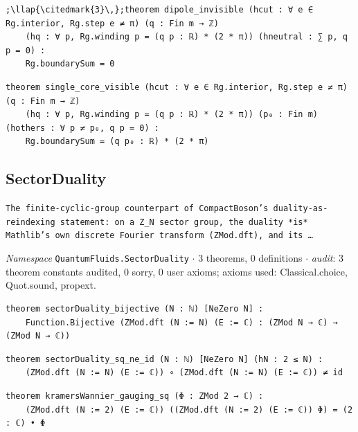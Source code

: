 \begin{lstlisting}[style=leancat]
;\llap{\citedmark{3}\,};theorem dipole_invisible (hcut : ∀ e ∈ Rg.interior, Rg.step e ≠ π) (q : Fin m → ℤ)
    (hq : ∀ p, Rg.winding p = (q p : ℝ) * (2 * π)) (hneutral : ∑ p, q p = 0) :
    Rg.boundarySum = 0
\end{lstlisting}

\begin{lstlisting}[style=leancat]
theorem single_core_visible (hcut : ∀ e ∈ Rg.interior, Rg.step e ≠ π) (q : Fin m → ℤ)
    (hq : ∀ p, Rg.winding p = (q p : ℝ) * (2 * π)) (p₀ : Fin m) (hothers : ∀ p ≠ p₀, q p = 0) :
    Rg.boundarySum = (q p₀ : ℝ) * (2 * π)
\end{lstlisting}

\subsection{SectorDuality}\label{appA:SectorDuality}
{\footnotesize\raggedright\texttt{The finite-\allowbreak{}cyclic-\allowbreak{}group counterpart of CompactBoson's duality-\allowbreak{}as-\allowbreak{}reindexing statement: on a Z\_\allowbreak{}N sector group,\allowbreak{} the duality *is* Mathlib's own discrete Fourier transform (ZMod.\allowbreak{}dft),\allowbreak{} and its …}\par}
{\footnotesize\raggedright\emph{Namespace} \texttt{QuantumFluids.\allowbreak{}SectorDuality} $\cdot$ 3 theorems, 0 definitions $\cdot$ \emph{audit}: 3 theorem constants audited, 0 sorry, 0 user axioms; axioms used: Classical.choice, Quot.sound, propext.\par}
\vspace{1pt}
\begin{lstlisting}[style=leancat]
theorem sectorDuality_bijective (N : ℕ) [NeZero N] :
    Function.Bijective (ZMod.dft (N := N) (E := ℂ) : (ZMod N → ℂ) → (ZMod N → ℂ))
\end{lstlisting}

\begin{lstlisting}[style=leancat]
theorem sectorDuality_sq_ne_id (N : ℕ) [NeZero N] (hN : 2 ≤ N) :
    (ZMod.dft (N := N) (E := ℂ)) ∘ (ZMod.dft (N := N) (E := ℂ)) ≠ id
\end{lstlisting}

\begin{lstlisting}[style=leancat]
theorem kramersWannier_gauging_sq (Φ : ZMod 2 → ℂ) :
    (ZMod.dft (N := 2) (E := ℂ)) ((ZMod.dft (N := 2) (E := ℂ)) Φ) = (2 : ℂ) • Φ
\end{lstlisting}

